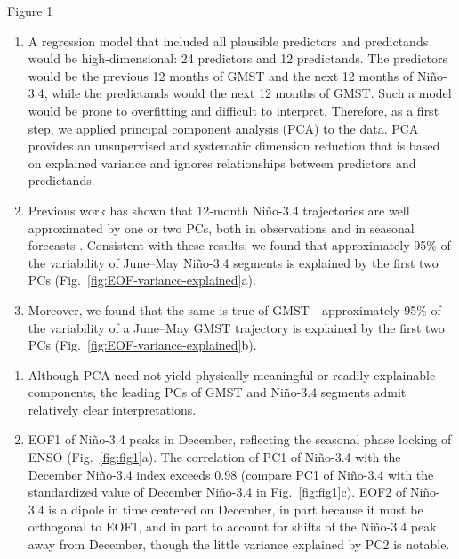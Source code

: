 \documentclass[aspectratio=169,xcolor=dvipsnames]{beamer}
\begin{document}
\begin{frame}{Figure 1}
  \begin{enumerate}\fontsize{6pt}{8pt}\selectfont

  \item A regression model that included all plausible predictors and
    predictands would be high-dimensional: 24 predictors and 12
    predictands. The predictors would be the previous 12 months of
    GMST and the next 12 months of Ni\~no-3.4, while the predictands
    would the next 12 months of GMST. Such a model would be prone to
    overfitting and difficult to interpret. Therefore, as a first
    step, we applied principal component analysis (PCA) to the
    data. PCA provides an unsupervised and systematic dimension
    reduction that is based on explained variance and ignores
    relationships between predictors and predictands.

  \item Previous work has shown that 12-month Ni\~no-3.4 trajectories
    are well approximated by one or two PCs, both in observations and
    in seasonal forecasts \citep{Bunge2009verified,Tippett2019:ENSO}.
    Consistent with these results, we found that approximately 95\% of
    the variability of June--May Ni\~no-3.4 segments is explained by the
    first two PCs (Fig.\ \ref{fig:EOF-variance-explained}a).
    
  \item Moreover, we found that the same is true of
    GMST---approximately 95\% of the variability of a June--May GMST
    trajectory is explained by the first two PCs (Fig.\
    \ref{fig:EOF-variance-explained}b).
  \end{enumerate}
  \begin{enumerate}\fontsize{6pt}{8pt}\selectfont

  \item Although PCA need not yield physically meaningful or readily
    explainable components, the leading PCs of GMST and Niño-3.4
    segments admit relatively clear interpretations.
    
  \item EOF1 of Ni\~no-3.4 peaks in December, reflecting the seasonal
    phase locking of ENSO (Fig.\ \ref{fig:fig1}a).  The correlation of
    PC1 of Ni\~no-3.4 with the December Ni\~no-3.4 index exceeds 0.98
    (compare PC1 of Ni\~no-3.4 with the standardized value of December
    Ni\~no-3.4 in Fig.\ \ref{fig:fig1}c).  EOF2 of Ni\~no-3.4 is a
    dipole in time centered on December, in part because it must be
    orthogonal to EOF1, and in part to account for shifts of the
    Ni\~no-3.4 peak away from December, though the little variance
    explained by PC2 is notable.
    

\end{enumerate}
\end{frame}
\end{document}

